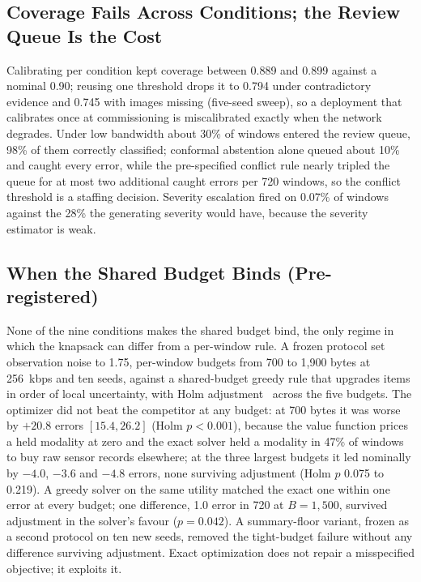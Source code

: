 \subsection{Coverage Fails Across Conditions; the Review Queue Is the Cost}
\label{sec:coverage}
Calibrating per condition kept coverage between 0.889 and 0.899 against a nominal 0.90; reusing one threshold drops it to 0.794 under contradictory evidence and 0.745 with images missing (five-seed sweep), so a deployment that calibrates once at commissioning is miscalibrated exactly when the network degrades. Under low bandwidth about 30\% of windows entered the review queue, 98\% of them correctly classified; conformal abstention alone queued about 10\% and caught every error, while the pre-specified conflict rule nearly tripled the queue for at most two additional caught errors per 720 windows, so the conflict threshold is a staffing decision. Severity escalation fired on 0.07\% of windows against the 28\% the generating severity would have, because the severity estimator is weak.

\subsection{When the Shared Budget Binds (Pre-registered)}
\label{sec:contested}
None of the nine conditions makes the shared budget bind, the only regime in which the knapsack can differ from a per-window rule. A frozen protocol set observation noise to 1.75, per-window budgets from 700 to 1,900 bytes at 256~kbps and ten seeds, against a shared-budget greedy rule that upgrades items in order of local uncertainty, with Holm adjustment~\cite{holm} across the five budgets. The optimizer did not beat the competitor at any budget: at 700 bytes it was worse by $+20.8$ errors $[15.4, 26.2]$ (Holm $p<0.001$), because the value function prices a held modality at zero and the exact solver held a modality in 47\% of windows to buy raw sensor records elsewhere; at the three largest budgets it led nominally by $-4.0$, $-3.6$ and $-4.8$ errors, none surviving adjustment (Holm $p$ 0.075 to 0.219). A greedy solver on the same utility matched the exact one within one error at every budget; one difference, 1.0 error in 720 at $B=1{,}500$, survived adjustment in the solver's favour ($p=0.042$). A summary-floor variant, frozen as a second protocol on ten new seeds, removed the tight-budget failure without any difference surviving adjustment. Exact optimization does not repair a misspecified objective; it exploits it.

